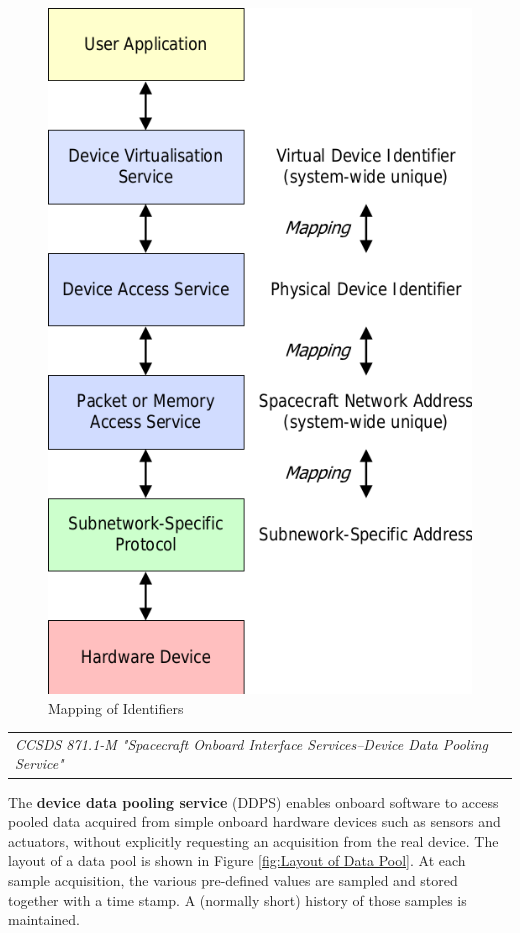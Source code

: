 \begin{figure}[h]
\centering\includegraphics[scale=0.3]{fig/mapping_of_identifiers}
\caption{Mapping of Identifiers}
\label{fig:Mapping of Identifiers}
\end{figure}

\begin{tabular}{l}
\textit{CCSDS 871.1-M "Spacecraft Onboard Interface Services--Device Data Pooling Service" \cite{CCSDS 871.1-M}} 
\end{tabular}

The \textbf{device data pooling service} (DDPS) enables onboard software to access pooled data acquired from simple onboard hardware devices such as sensors and actuators, without explicitly requesting an acquisition from the real device. The layout of a data pool is shown in Figure \ref{fig:Layout of Data Pool}. At each sample acquisition, the various pre-defined values are sampled and stored together with a time stamp. A (normally short) history of those samples is maintained.

